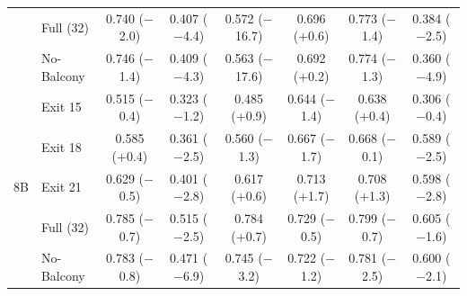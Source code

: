 \begin{table}[t]
{\begin{tabular}{ll cccccc}
 & Full (32) & 0.740 \scriptsize{($-$2.0)} & 0.407 \scriptsize{($-$4.4)} & 0.572 \scriptsize{($-$16.7)} & 0.696 \scriptsize{(+0.6)} & 0.773 \scriptsize{($-$1.4)} & 0.384 \scriptsize{($-$2.5)} \\
 & No-Balcony & 0.746 \scriptsize{($-$1.4)} & 0.409 \scriptsize{($-$4.3)} & 0.563 \scriptsize{($-$17.6)} & 0.692 \scriptsize{(+0.2)} & 0.774 \scriptsize{($-$1.3)} & 0.360 \scriptsize{($-$4.9)} \\
\midrule
\multirow{5}{*}{8B} & Exit 15 & 0.515 \scriptsize{($-$0.4)} & 0.323 \scriptsize{($-$1.2)} & 0.485 \scriptsize{(+0.9)} & 0.644 \scriptsize{($-$1.4)} & 0.638 \scriptsize{(+0.4)} & 0.306 \scriptsize{($-$0.4)} \\
 & Exit 18 & 0.585 \scriptsize{(+0.4)} & 0.361 \scriptsize{($-$2.5)} & 0.560 \scriptsize{($-$1.3)} & 0.667 \scriptsize{($-$1.7)} & 0.668 \scriptsize{($-$0.1)} & 0.589 \scriptsize{($-$2.5)} \\
 & Exit 21 & 0.629 \scriptsize{($-$0.5)} & 0.401 \scriptsize{($-$2.8)} & 0.617 \scriptsize{(+0.6)} & 0.713 \scriptsize{(+1.7)} & 0.708 \scriptsize{(+1.3)} & 0.598 \scriptsize{($-$2.8)} \\
 & Full (32) & 0.785 \scriptsize{($-$0.7)} & 0.515 \scriptsize{($-$2.5)} & 0.784 \scriptsize{(+0.7)} & 0.729 \scriptsize{($-$0.5)} & 0.799 \scriptsize{($-$0.7)} & 0.605 \scriptsize{($-$1.6)} \\
 & No-Balcony & 0.783 \scriptsize{($-$0.8)} & 0.471 \scriptsize{($-$6.9)} & 0.745 \scriptsize{($-$3.2)} & 0.722 \scriptsize{($-$1.2)} & 0.781 \scriptsize{($-$2.5)} & 0.600 \scriptsize{($-$2.1)} \\
\bottomrule
\end{tabular}}
\end{table}
